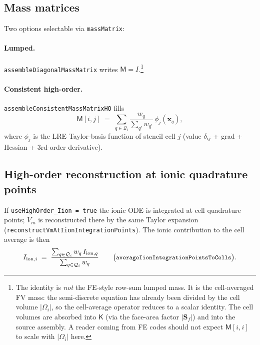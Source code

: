 \documentclass[11pt,a4paper]{article}
\newcommand{\Vm}{V_{m}}
\newcommand{\Iionsub}[1]{I_{\text{ion},#1}}
\newcommand{\Mmass}{\mathsf{M}}
\newcommand{\Kstif}{\mathsf{K}}
\newcommand{\code}[1]{\texttt{\small #1}}
\begin{document}
\subsection{Mass matrices}

Two options selectable via \code{massMatrix}:
\paragraph{Lumped.} \code{assembleDiagonalMassMatrix} writes
$\Mmass = I$.\footnote{The identity is \emph{not} the FE-style row-sum
lumped mass. It is the cell-averaged FV mass: the semi-discrete
equation has already been divided by the cell volume $|\Omega_{i}|$,
so the cell-average operator reduces to a scalar identity. The cell
volumes are absorbed into $\Kstif$ (via the face-area factor
$|\mathbf{S}_{f}|$) and into the source assembly. A reader coming from
FE codes should not expect $\Mmass[i,i]$ to scale with $|\Omega_{i}|$
here.}

\paragraph{Consistent high-order.}
\code{assembleConsistentMassMatrixHO} fills
\begin{equation}
  \Mmass[i, j] \;=\;
   \sum_{q \in \mathcal{Q}_{i}}
       \frac{w_{q}}{\sum_{q'} w_{q'}}\,
       \phi_{j}(\mathbf{x}_{q}),
\end{equation}
where $\phi_{j}$ is the LRE Taylor-basis function of stencil cell $j$
(value $\delta_{ij}$ + grad + Hessian + 3rd-order derivative).

\subsection{High-order reconstruction at ionic quadrature points}

If \code{useHighOrder\_Iion = true} the ionic ODE is integrated at cell
quadrature points; $\Vm$ is reconstructed there by the same Taylor
expansion (\code{reconstructVmAtIionIntegrationPoints}). The ionic
contribution to the cell average is then
\begin{equation}
  \Iionsub{i} \;=\;
   \frac{\sum_{q \in \mathcal{Q}_{i}} w_{q}\, \Iionsub{q}}
        {\sum_{q \in \mathcal{Q}_{i}} w_{q}}
   \qquad
   \bigl(\text{\code{averageIionIntegrationPointsToCells}}\bigr).
\end{equation}

\end{document}
